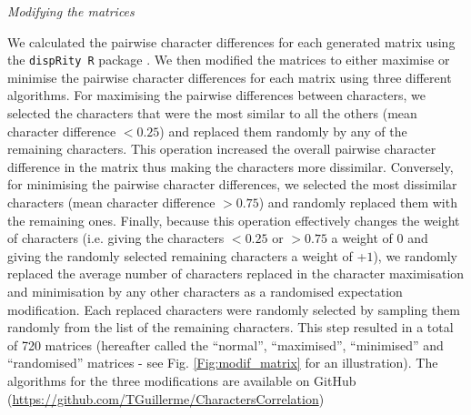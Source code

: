 \documentclass[12pt,letterpaper]{article}
\renewcommand{\subsection}[1]{%
\bigskip
\begin{center}
\begin{large}
\normalfont\itshape #1
\end{large}
\end{center}}
\begin{document}
\subsection{Modifying the matrices}
We calculated the pairwise character differences for each generated matrix using the \texttt{dispRity R} package \citep{thomas_guillerme_2016_55646}.
We then modified the matrices to either maximise or minimise the pairwise character differences for each matrix using three different algorithms.
For maximising the pairwise differences between characters, we selected the characters that were the most similar to all the others (mean character difference $<0.25$) and replaced them randomly by any of the remaining characters.
This operation increased the overall pairwise character difference in the matrix thus making the characters more dissimilar.
Conversely, for minimising the pairwise character differences, we selected the most dissimilar characters (mean character difference $>0.75$) and randomly replaced them with the remaining ones.
Finally, because this operation effectively changes the weight of characters (i.e. giving the characters $<0.25$ or $>0.75$ a weight of $0$ and giving the randomly selected remaining characters a weight of +$1$), we randomly replaced the average number of characters replaced in the character maximisation and minimisation by any other characters as a randomised expectation modification.%
Each replaced characters were randomly selected by sampling them randomly from the list of the remaining characters.
This step resulted in a total of 720 matrices (hereafter called the ``normal'', ``maximised'', ``minimised'' and ``randomised'' matrices - see Fig. \ref{Fig:modif_matrix} for an illustration).
The algorithms for the three modifications are available on GitHub (\url{https://github.com/TGuillerme/CharactersCorrelation})
\end{document}
